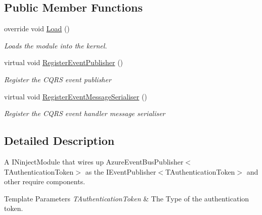 \subsection*{Public Member Functions}
\begin{DoxyCompactItemize}
\item 
override void \hyperlink{classCqrs_1_1Azure_1_1EventHub_1_1EventBus_1_1Configuration_1_1AzureEventHubPublisherModule_a1053c9b0a8d649bb63f1404563186677_a1053c9b0a8d649bb63f1404563186677}{Load} ()
\begin{DoxyCompactList}\small\item\em Loads the module into the kernel. \end{DoxyCompactList}\item 
virtual void \hyperlink{classCqrs_1_1Azure_1_1EventHub_1_1EventBus_1_1Configuration_1_1AzureEventHubPublisherModule_a86c95fe05f75c63d85a52a3052f3b016_a86c95fe05f75c63d85a52a3052f3b016}{Register\+Event\+Publisher} ()
\begin{DoxyCompactList}\small\item\em Register the C\+Q\+RS event publisher \end{DoxyCompactList}\item 
virtual void \hyperlink{classCqrs_1_1Azure_1_1EventHub_1_1EventBus_1_1Configuration_1_1AzureEventHubPublisherModule_adc517a90b48388fb0f8ce5e56094aff5_adc517a90b48388fb0f8ce5e56094aff5}{Register\+Event\+Message\+Serialiser} ()
\begin{DoxyCompactList}\small\item\em Register the C\+Q\+RS event handler message serialiser \end{DoxyCompactList}\end{DoxyCompactItemize}


\subsection{Detailed Description}
A I\+Ninject\+Module that wires up Azure\+Event\+Bus\+Publisher$<$\+T\+Authentication\+Token$>$ as the I\+Event\+Publisher$<$\+T\+Authentication\+Token$>$ and other require components. 


\begin{DoxyTemplParams}{Template Parameters}
{\em T\+Authentication\+Token} & The Type of the authentication token.\\
\hline
\end{DoxyTemplParams}


